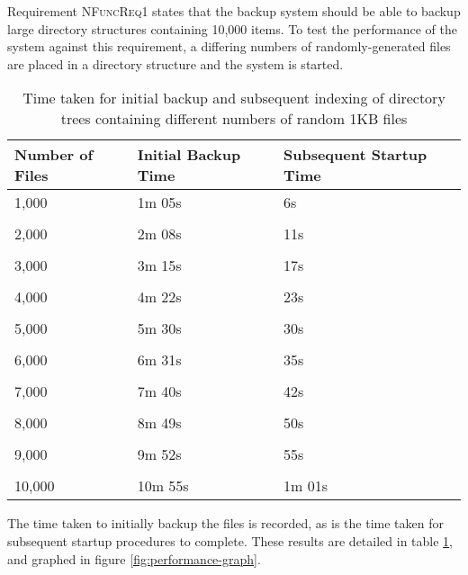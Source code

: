 Requirement \textsc{NFuncReq1} states that the backup system should be able to
backup large directory structures containing 10,000 items. To test the
performance of the system against this requirement, a differing numbers of
randomly-generated files are placed in a directory structure and the system is
started.

\begin{table}
    \centering
    \begin{tabular}{ l l l }
        Number of Files & Initial Backup Time   & Subsequent Startup Time
        \\ \toprule
        1,000           & 1m 05s                & 6s
        \\ \\
        2,000           & 2m 08s                & 11s
        \\ \\
        3,000           & 3m 15s                & 17s
        \\ \\
        4,000           & 4m 22s                & 23s
        \\ \\
        5,000           & 5m 30s                & 30s
        \\ \\
        6,000           & 6m 31s                & 35s
        \\ \\
        7,000           & 7m 40s                & 42s
        \\ \\
        8,000           & 8m 49s                & 50s
        \\ \\
        9,000           & 9m 52s                & 55s
        \\ \\
        10,000          & 10m 55s               & 1m 01s
        \\ \bottomrule
    \end{tabular}
    \caption{Time taken for initial backup and subsequent indexing of
    directory trees containing different numbers of random 1KB files}
    \label{tab:performance}
\end{table}

The time taken to initially backup the files is recorded, as is the time taken
for subsequent startup procedures to complete. These results are detailed in
table \ref{tab:performance}, and graphed in figure \ref{fig:performance-graph}.

